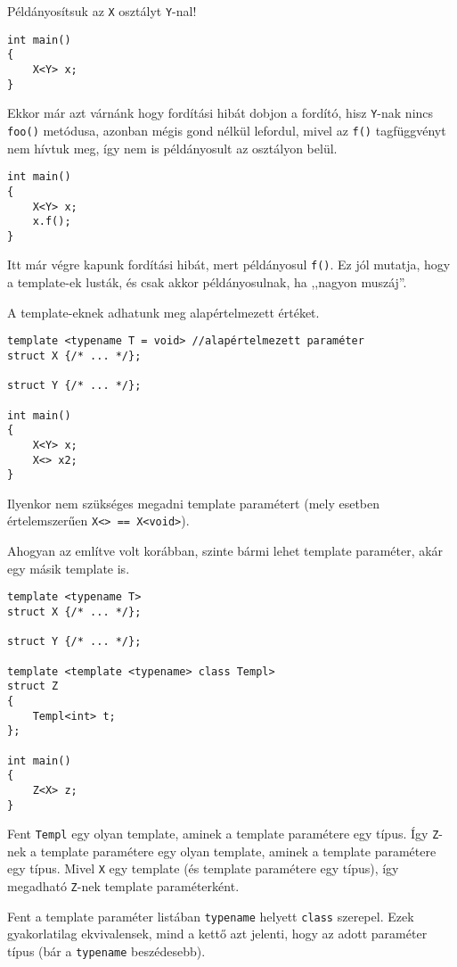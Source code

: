\documentclass[a4paper,11.5pt,table]{article}
\begin{document}
	\smallskip
	Példányosítsuk az \texttt{X} osztályt \texttt{Y}-nal!
\begin{lstlisting}
int main()
{
	X<Y> x;
}
\end{lstlisting}
	Ekkor már azt várnánk hogy fordítási hibát dobjon a fordító, hisz \texttt{Y}-nak nincs \texttt{foo()} metódusa, azonban mégis gond nélkül lefordul, mivel az \texttt{f()} tagfüggvényt nem hívtuk meg, így nem is példányosult az osztályon belül.
	\begin{lstlisting}
int main()
{
	X<Y> x;
	x.f();
}
	\end{lstlisting}
	Itt már végre kapunk fordítási hibát, mert példányosul \texttt{f()}. Ez jól mutatja, hogy a template-ek lusták, és csak akkor példányosulnak, ha ,,nagyon muszáj''.
	\medskip
	
	A template-eknek adhatunk meg alapértelmezett értéket.

\begin{lstlisting}
template <typename T = void> //alapértelmezett paraméter
struct X {/* ... */};

struct Y {/* ... */};

int main()
{
	X<Y> x;
	X<> x2;
}
\end{lstlisting}
	Ilyenkor nem szükséges megadni template paramétert (mely esetben értelemszerűen \texttt{X<> == X<void>}). 
	
	\smallskip
	Ahogyan az említve volt korábban, szinte bármi lehet template paraméter, akár egy másik template is.

\begin{lstlisting}
template <typename T>
struct X {/* ... */};

struct Y {/* ... */};

template <template <typename> class Templ>
struct Z
{
	Templ<int> t;
};

int main()
{
	Z<X> z;
}
\end{lstlisting}
	Fent \texttt{Templ} egy olyan template, aminek a template paramétere egy típus. Így \texttt{Z}-nek a template paramétere egy olyan template, aminek a template paramétere egy típus. Mivel \texttt{X} egy template (és template paramétere egy típus), így megadható \texttt{Z}-nek template paraméterként.
	\begin{note}
		Fent a template paraméter listában \texttt{typename} helyett \texttt{class} szerepel. Ezek gyakorlatilag ekvivalensek, mind a kettő azt jelenti, hogy az adott paraméter típus (bár a \texttt{typename} beszédesebb).
	\end{note}
	
\end{document}
